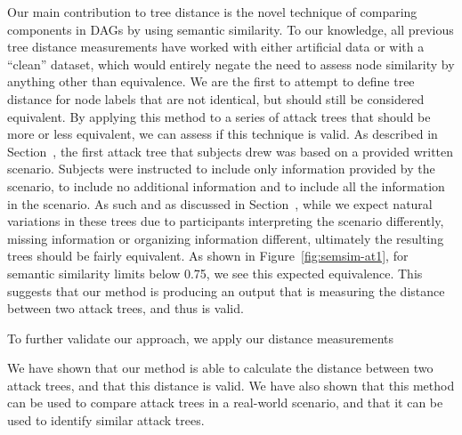Our main contribution to tree distance is the novel technique of comparing components in DAGs by using semantic similarity. To our knowledge, all previous tree distance measurements have worked with either artificial data or with a ``clean'' dataset, which would entirely negate the need to assess node similarity by anything other than equivalence. We are the first to attempt to define tree distance for node labels that are not identical, but should still be considered equivalent. By applying this method to a series of attack trees that should be more or less equivalent, we can assess if this technique is valid. As described in Section~, the first attack tree that subjects drew was based on a provided written scenario. Subjects were instructed to include only information provided by the scenario, to include no additional information and to include all the information in the scenario. As such and as discussed in Section~, while we expect natural variations in these trees due to participants interpreting the scenario differently, missing information or organizing information different, ultimately the resulting trees should be fairly equivalent. As shown in Figure~\ref{fig:semsim-at1}, for semantic similarity limits  below 0.75, we see this expected equivalence. This suggests that our method is producing an output that is measuring the distance between two attack trees, and thus is valid.

To further validate our approach, we apply our distance measurements



We have shown that our method is able to calculate the distance between two attack trees, and that this distance is valid. We have also shown that this method can be used to compare attack trees in a real-world scenario, and that it can be used to identify similar attack trees.
 

